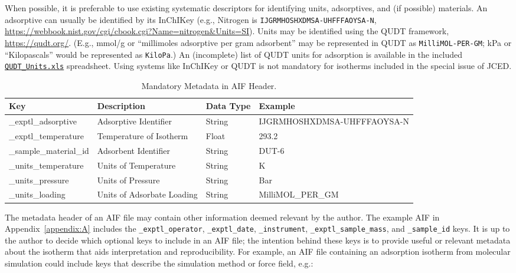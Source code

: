 \documentclass[preprint,pre,showkeys,12pt,superscriptaddress,nofootinbib,endfloats*]{revtex4-1}
\begin{document}
When possible, it is preferable to use existing systematic descriptors for identifying units, adsorptives, and (if possible) materials. An adsorptive can usually be identified by its InChIKey (e.g., Nitrogen is \verb!IJGRMHOSHXDMSA-UHFFFAOYSA-N!, \url{https://webbook.nist.gov/cgi/cbook.cgi?Name=nitrogen&Units=SI}). Units may be identified using the QUDT framework, \url{https://qudt.org/}. (E.g., mmol/g or ``millimoles adsorptive per gram adsorbent'' may be represented in QUDT as \verb!MilliMOL-PER-GM!; kPa or ``Kilopascals'' would be represented as \verb!KiloPa!.) An (incomplete) list of QUDT units for adsorption is available in the included \href{https://raw.githubusercontent.com/NIST-ISODB/aif_tutorial/master/Files/QUDT_Units.xlsx}{\texttt{QUDT\_Units.xls}} spreadsheet. Using systems like InChIKey or QUDT is not mandatory for isotherms included in the special issue of JCED.

\begin{table}%
  \begin{center}
    \label{tab:meta_req}
    \begin{tabular}{l|l|l|l}
      \textbf{Key} & \textbf{Description} & \textbf{Data Type} & \textbf{Example}\\
      \hline
      \_exptl\_adsorptive & Adsorptive Identifier & String & IJGRMHOSHXDMSA-UHFFFAOYSA-N \\
      \_exptl\_temperature & Temperature of Isotherm & Float & 293.2 \\
      \_sample\_material\_id & Adsorbent Identifier & String & DUT-6 \\
      \_units\_temperature & Units of Temperature & String & K \\
      \_units\_pressure & Units of Pressure & String & Bar \\
      \_units\_loading & Units of Adsorbate Loading & String & MilliMOL\_PER\_GM \\
    \end{tabular}
    \caption{Mandatory Metadata in AIF Header.}
  \end{center}
\end{table}

The metadata header of an AIF file may contain other information deemed relevant by the author. The example AIF in Appendix~\ref{appendix:A} includes the \verb!_exptl_operator!, \verb!_exptl_date!, \verb!_instrument!, \verb!_exptl_sample_mass!, and \verb!_sample_id! keys. It is up to the author to decide which optional keys to include in an AIF file; the intention behind these keys is to provide useful or relevant metadata about the isotherm that aids interpretation and reproducibility. For example, an AIF file containing an adsorption isotherm from molecular simulation could include keys that describe the simulation method or force field, e.g.:\newline
\end{document}
